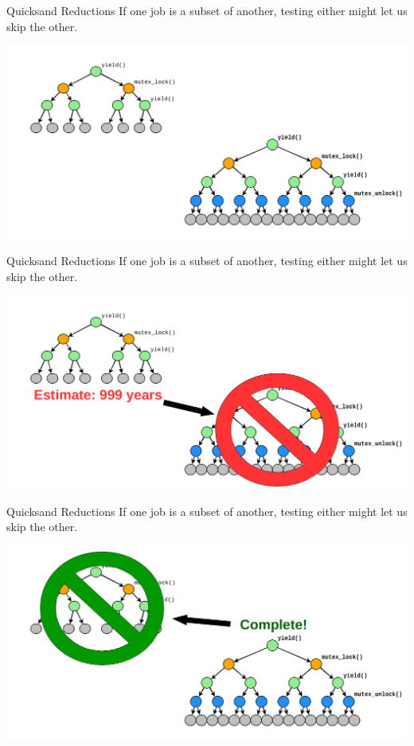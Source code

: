 \documentclass[xcolor=dvipsnames]{beamer}
\begin{document}
\begin{frame}{Quicksand Reductions}
	If one job is a subset of another, testing either might let us skip the other.
	\begin{center}
		\includegraphics[width=\textwidth]{../../oopsla/reduction-nothing.png}
	\end{center}
\end{frame}
\begin{frame}{Quicksand Reductions}
	If one job is a subset of another, testing either might let us skip the other.
	\begin{center}
		\includegraphics[width=\textwidth]{../../oopsla/reduction-deferred.png}
	\end{center}
\end{frame}
\begin{frame}{Quicksand Reductions}
	If one job is a subset of another, testing either might let us skip the other.
	\begin{center}
		\includegraphics[width=\textwidth]{../../oopsla/reduction-complete.png}
	\end{center}
\end{frame}
\end{document}

